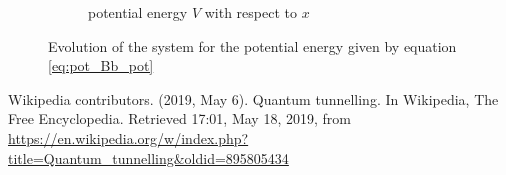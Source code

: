 \documentclass[a4paper,12pt,twoside]{article}
\begin{document}
\begin{figure}[h]
\begin{subfigure}[t]{0.45\textwidth}
            \caption{potential energy $V$ with respect to $x$}
            \label{fig:v_pot_Bb_pot}
          \end{subfigure}
          \caption{Evolution of the system for the potential energy given by equation \eqref{eq:pot_Bb_pot}}
          \label{fig:v_pot_Bb}
        \end{figure}



\newpage
\begin{thebibliography}{99}
   Wikipedia contributors. (2019, May 6). Quantum tunnelling. In Wikipedia, The Free Encyclopedia. Retrieved 17:01, May 18, 2019, from \url{https://en.wikipedia.org/w/index.php?title=Quantum_tunnelling&oldid=895805434}
\end{thebibliography}
\end{document}
